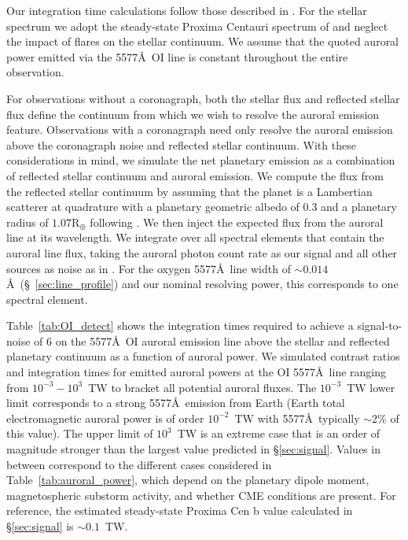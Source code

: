 \documentclass{emulateapj}
\begin{document}
Our integration time calculations follow those described in \citet{Robinson2016}. For the stellar spectrum we adopt the steady-state Proxima Centauri spectrum of \citet{Meadows2016} and neglect the impact of flares on the stellar continuum. We assume that the quoted auroral power emitted via the 5577\AA\ OI line is constant throughout the entire observation.

For observations without a coronagraph, both the stellar flux and reflected stellar flux define the continuum from which we wish to resolve the auroral emission feature. Observations with a coronagraph need only resolve the auroral emission above the coronagraph noise and reflected stellar continuum.  With these considerations in mind, we simulate the net planetary emission as a combination of reflected stellar continuum and auroral emission.  We compute the flux from the reflected stellar continuum by assuming that the planet is a Lambertian scatterer at quadrature with a planetary geometric albedo of 0.3 and a planetary radius of $1.07\mathrm{R}_{\oplus}$  following \citet{Barnes2016}.  We then inject the expected flux from the auroral line at its wavelength.  We integrate over all spectral elements that contain the auroral line flux, taking the auroral photon count rate as our signal and all other sources as noise as in \citet{Robinson2016}.  For the oxygen 5577\AA\ line width of ${\sim} 0.014$\AA\ (\S~\ref{sec:line_profile}) and our nominal resolving power, this corresponds to one spectral element.

Table~\ref{tab:OI_detect} shows the integration times required to achieve a signal-to-noise of 6 on the 5577\AA\ OI auroral emission line above the stellar and reflected planetary continuum as a function of auroral power.  We simulated contrast ratios and integration times for emitted auroral powers at the OI 5577\AA\ line ranging from $10^{-3} - 10^{3}$~TW to bracket all potential auroral fluxes. The $10^{-3}$~TW lower limit corresponds to a strong 5577\AA\ emission from Earth (Earth total electromagnetic auroral power is of order $10^{-2}$~TW with 5577\AA\ typically $\sim$2\% of this value). The upper limit of $10^{3}$~TW is an extreme case that is an order of magnitude stronger than the largest value predicted in \S\ref{sec:signal}. Values in between correspond to the different cases considered in Table~\ref{tab:auroral_power}, which depend on the planetary dipole moment, magnetospheric substorm activity, and whether CME conditions are present. For reference, the estimated steady-state Proxima Cen b value calculated in \S\ref{sec:signal} is ${\sim}0.1$~TW.
\end{document}
